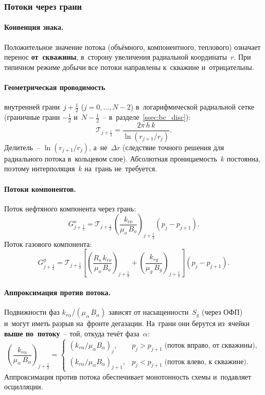 \documentclass[12pt,a4paper]{article}
\newcommand{\half}{\tfrac{1}{2}}
\begin{document}
\subsubsection{Потоки через грани}

\paragraph{Конвенция знака.}
Положительное значение потока (объёмного, компонентного,
теплового) означает перенос \textbf{от~скважины}, в~сторону
увеличения радиальной координаты~$r$. При типичном режиме
добычи все потоки направлены к~скважине и~отрицательны.

\paragraph{Геометрическая проводимость} внутренней грани~$j+\half$
($j = 0, \ldots, N-2$) в~логарифмической радиальной сетке
(граничные грани $-\half$ и~$N-\half$~-- в~разделе~\ref{ssec:bc_disc}):
\begin{equation}\label{eq:transmissibility}
  \mathcal{T}_{j+\half} = \frac{2\pi\,h\,k}{\ln(r_{j+1}/r_j)}.
\end{equation}
Делитель~-- $\ln(r_{j+1}/r_j)$, а~не~$\Delta r$ (следствие точного
решения для радиального потока в~кольцевом слое).
Абсолютная проницаемость~$k$ постоянна, поэтому интерполяция~$k$
на~грань не~требуется.

\paragraph{Потоки компонентов.}
Поток нефтяного компонента через грань:
\begin{equation}\label{eq:flux_oil}
  G_{j+\half}^{o} = \mathcal{T}_{j+\half}\,
    \left(\frac{k_{ro}}{\mu_o\,B_o}\right)_{\!j+\half}
    \!(p_j - p_{j+1}).
\end{equation}
Поток газового компонента:
\begin{equation}\label{eq:flux_gas}
  G_{j+\half}^{g}
  = \mathcal{T}_{j+\half}\!\left[
      \left(\frac{R_s\,k_{ro}}{\mu_o\,B_o}\right)_{\!j+\half}
      + \left(\frac{k_{rg}}{\mu_g\,B_g}\right)_{\!j+\half}
    \right](p_j - p_{j+1}).
\end{equation}

\paragraph{Аппроксимация против потока.}
Подвижности фаз $k_{r\alpha}/(\mu_\alpha\,B_\alpha)$ зависят от
насыщенности~$S_g$ (через ОФП) и~могут иметь разрыв на~фронте
дегазации. На~грани они берутся из~ячейки \textbf{выше по~потоку}~--
той, откуда течёт фаза~$\alpha$:
\[
  \left(\frac{k_{r\alpha}}{\mu_\alpha\,B_\alpha}\right)_{\!j+\half}
  = \begin{cases}
      (k_{r\alpha}/\mu_\alpha B_\alpha)_j, & p_j > p_{j+1}
        \;\text{(поток вправо, от скважины)}, \\
      (k_{r\alpha}/\mu_\alpha B_\alpha)_{j+1}, & p_j < p_{j+1}
        \;\text{(поток влево, к скважине)}.
    \end{cases}
\]
Аппроксимация против потока обеспечивает монотонность схемы
и~подавляет осцилляции.
\end{document}
